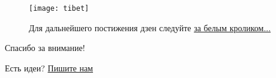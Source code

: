 \vspace*{\fill}
\begin{center}
    \begin{figure}[ht!]
    \centering
    \texttt{[image: tibet]}
    \caption{Для дальнейшего постижения дзен следуйте \href{https://antoniii.github.io/dzen}{за белым кроликом...}}
\end{figure}
\end{center}
\vspace{2em}
\begin{center}
    \large 
    Спасибо за внимание!

    \vspace{2em}
    Есть идеи?
    \href{mailto:anto-kha0@rambler.ru}{Пишите нам}
\end{center}
\vfill
\pagestyle{empty}


